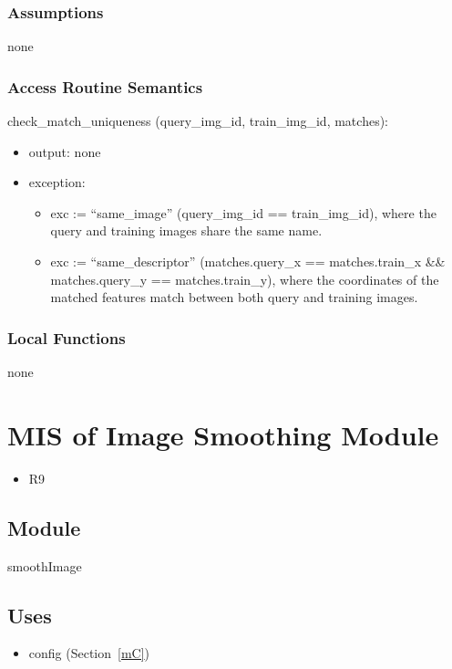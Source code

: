 \documentclass[12pt, titlepage]{article}
\begin{document}
\subsubsection{Assumptions}
none

\subsubsection{Access Routine Semantics}

\noindent check\_match\_uniqueness (query\_img\_id, train\_img\_id, matches):
\begin{itemize}
  \item output: none 
  \item exception:
  \begin{itemize}
    \item exc := ``same\_image'' \textbar{} (query\_img\_id == train\_img\_id), where the query and training images share the same name.
    \item exc := ``same\_descriptor'' \textbar{} (matches.query\_x == matches.train\_x \&\& matches.query\_y == matches.train\_y), where the coordinates of the matched features match between both query and training images.
  \end{itemize}
\end{itemize}


\subsubsection{Local Functions}
none


\section{MIS of Image Smoothing Module} \label{mIS}
\begin{itemize}
  \item R9
\end{itemize}
\subsection{Module}
smoothImage

\subsection{Uses}
\begin{itemize}
  \item config (Section~\ref{mC})
\end{itemize}
\end{document}
